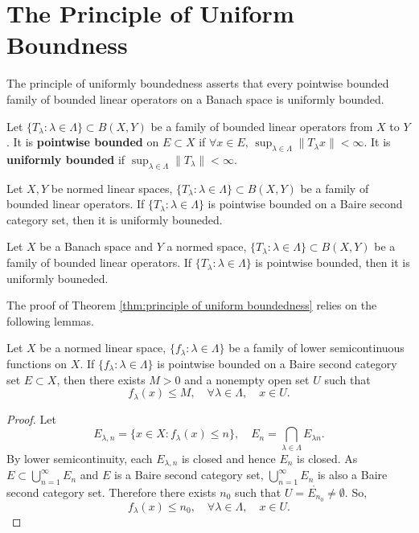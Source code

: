 \section{The Principle of Uniform Boundness}
The principle of uniformly boundedness asserts that every pointwise bounded family of bounded linear operators on a Banach space is uniformly bounded.

Let $\{T_\lambda:\lambda\in\Lambda\}\subset B(X,Y)$ be a family of bounded linear operators from $X$ to $Y$.
It is \textbf{pointwise bounded} on $E\subset X$ if $\forall x\in E,\,\sup_{\lambda\in\Lambda}\|T_\lambda x\|<\infty$.
It is \textbf{uniformly bounded} if $\sup_{\lambda\in\Lambda}\|T_\lambda \|<\infty$.
\begin{theorem}\label{thm:principle of uniform boundedness}
    Let $X,Y$ be normed linear spaces, $\{T_\lambda:\lambda\in\Lambda\}\subset B(X,Y)$ be a family of bounded linear operators.
    If $\{T_\lambda:\lambda\in\Lambda\}$ is pointwise bounded on a Baire second category set, then it is uniformly bouneded.
\end{theorem}

\begin{corollary}
    Let $X$ be a Banach space and $Y$ a normed space, $\{T_\lambda:\lambda\in\Lambda\}\subset B(X,Y)$ be a family of bounded linear operators.
    If $\{T_\lambda:\lambda\in\Lambda\}$ is pointwise bounded, then it is uniformly bouneded.
\end{corollary}

The proof of Theorem \ref{thm:principle of uniform boundedness} relies on the following lemmas.
\begin{lemma}[Osgood]
    Let $X$ be a normed linear space, $\{f_\lambda:\lambda\in\Lambda\}$ be a family of lower semicontinuous functions on $X$.
    If $\{f_\lambda:\lambda\in\Lambda\}$ is pointwise bounded on a Baire second category set $E\subset X$, then there exists $M>0$ and a nonempty open set $U$ such that 
    $$f_\lambda(x)\leq M,\quad\forall\lambda\in\Lambda,\quad x\in U.$$
\end{lemma}
\begin{proof}
    Let $$E_{\lambda,n}=\{x\in X:f_\lambda(x)\leq n\},\quad E_n=\bigcap_{\lambda\in \Lambda}E_{\lambda n}.$$
    By lower semicontinuity, each $E_{\lambda,n}$ is closed and hence $E_n$ is closed. As $E\subset \bigcup_{n=1}^\infty E_n$ and $E$ is a Baire second category set,
    $\bigcup_{n=1}^\infty E_n$ is also a Baire second category set.
    Therefore there exists $n_0$ such that $U=\mathring{E_{n_0}}\neq\emptyset$. So, $$f_\lambda(x)\leq n_0,\quad\forall\lambda\in\Lambda,\quad x\in U.$$
\end{proof}

